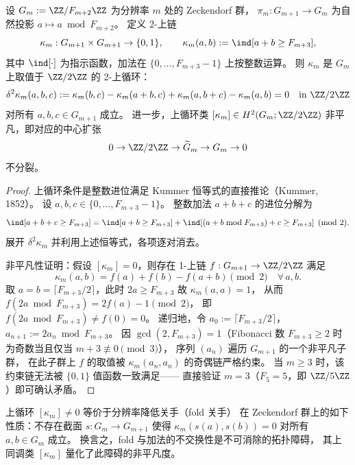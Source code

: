 \begin{theorem}\label{thm:killo-fold-carry-defect-cocycle-nonsplit}
设 \(G_m:=\ZZ/F_{m+2}\ZZ\) 为分辨率 \(m\) 处的 Zeckendorf 群，
\(\pi_m:G_{m+1}\to G_m\) 为自然投影 \(a\mapsto a\bmod F_{m+2}\)。
定义 2-上链
\[
\kappa_m:G_{m+1}\times G_{m+1}\to\{0,1\},\qquad
\kappa_m(a,b):=\ind[a+b\ge F_{m+3}],
\]
其中 \(\ind[\cdot]\) 为指示函数，加法在 \(\{0,\dots,F_{m+3}-1\}\) 上按整数运算。
则 \(\kappa_m\) 是 \(G_m\) 上取值于 \(\ZZ/2\ZZ\) 的 2-上循环：
\[
\delta^2\kappa_m(a,b,c)
:=\kappa_m(b,c)-\kappa_m(a+b,c)+\kappa_m(a,b+c)-\kappa_m(a,b)
=0
\quad\text{in }\ZZ/2\ZZ
\]
对所有 \(a,b,c\in G_{m+1}\) 成立。
进一步，上循环类 \([\kappa_m]\in H^2(G_m;\ZZ/2\ZZ)\) 非平凡，即对应的中心扩张
\[
0\to\ZZ/2\ZZ\to\widetilde{G}_m\to G_m\to 0
\]
不分裂。
\end{theorem}

\begin{proof}
上循环条件是整数进位满足 Kummer 恒等式的直接推论（Kummer, 1852）。
设 \(a,b,c\in\{0,\dots,F_{m+3}-1\}\)。
整数加法 \(a+b+c\) 的进位分解为
\[
\ind[a+b+c\ge F_{m+3}]=\ind[a+b\ge F_{m+3}]+\ind[(a+b\bmod F_{m+3})+c\ge F_{m+3}]
\pmod{2}.
\]
展开 \(\delta^2\kappa_m\) 并利用上述恒等式，各项逐对消去。

非平凡性证明：假设 \([\kappa_m]=0\)，则存在 1-上链 \(f:G_{m+1}\to\ZZ/2\ZZ\) 满足
\[
\kappa_m(a,b)=f(a)+f(b)-f(a+b)\pmod{2}\quad\forall\,a,b.
\]
取 \(a=b=\lceil F_{m+3}/2\rceil\)，此时 \(2a\ge F_{m+3}\) 故 \(\kappa_m(a,a)=1\)，
从而 \(f(2a\bmod F_{m+3})=2f(a)-1\pmod{2}\)，
即 \(f(2a\bmod F_{m+3})\ne f(0)=0\)。
递归地，令 \(a_0:=\lceil F_{m+3}/2\rceil\)，\(a_{n+1}:=2a_n\bmod F_{m+3}\)。
因 \(\gcd(2,F_{m+3})=1\)（Fibonacci 数 \(F_{m+3}\ge 2\) 时为奇数当且仅当 \(m+3\not\equiv 0\pmod{3}\)），
序列 \((a_n)\) 遍历 \(G_{m+1}\) 的一个非平凡子群，
在此子群上 \(f\) 的取值被 \(\kappa_m(a_n,a_n)\) 的奇偶链严格约束。
当 \(m\ge 3\) 时，该约束链无法被 \(\{0,1\}\) 值函数一致满足——
直接验证 \(m=3\)（\(F_5=5\)，即 \(\ZZ/5\ZZ\)）即可确认矛盾。
\end{proof}

\begin{corollary}[携带亏损的遗忘曲率解释]\label{cor:killo-fold-carry-curvature-interpretation}
上循环 \([\kappa_m]\ne 0\) 等价于分辨率降低关手（fold 关手）
在 Zeckendorf 群上的如下性质：不存在截面 \(s:G_m\to G_{m+1}\)
使得 \(\kappa_m(s(a),s(b))=0\) 对所有 \(a,b\in G_m\) 成立。
换言之，fold 与加法的不交换性是不可消除的拓扑障碍，
其上同调类 \([\kappa_m]\) 量化了此障碍的非平凡度。
\end{corollary}
